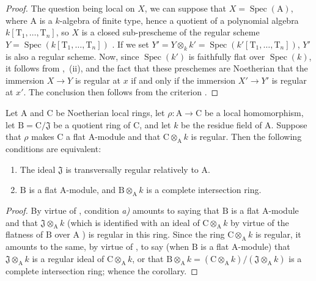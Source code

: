 \begin{proof}
The question being local on $X$, we can suppose that $X=\operatorname{Spec}(\mathrm{A})$, where $\mathrm{A}$ is a $k$-algebra of finite type, hence a quotient of a polynomial algebra $k[\mathrm{T}_1,\ldots,\mathrm{T}_n]$, so $X$ is a closed sub-prescheme of the regular scheme $Y=\operatorname{Spec}(k[\mathrm{T}_1,\ldots,\mathrm{T}_n])$ .
If we set $Y'=Y\otimes_k k'=\operatorname{Spec}(k'[\mathrm{T}_1,\ldots,\mathrm{T}_n])$, $Y'$ is also a regular scheme.
Now, since $\operatorname{Spec}(k')$ is faithfully flat over $\operatorname{Spec}(k)$, it follows from ,~(ii), and the fact that these preschemes are Noetherian that the immersion $X\to Y$ is regular at $x$ if and only if the immersion $X'\to Y'$ is regular at $x'$.
The conclusion then follows from the criterion .
\end{proof}

\begin{corollary}[19.3.5]
\label{IV.19.3.5}
Let $\mathrm{A}$ and $\mathrm{C}$ be Noetherian local rings, let $\rho:\mathrm{A}\to\mathrm{C}$ be a local homomorphism, let $\mathrm{B}=\mathrm{C}/\mathfrak{J}$ be a quotient ring of $\mathrm{C}$, and let $k$ be the residue field of $\mathrm{A}$.
Suppose that $\rho$ makes $\mathrm{C}$ a flat $\mathrm{A}$-module and that $\mathrm{C}\otimes_{\mathrm{A}}k$ is regular.
Then the following conditions are equivalent:
\begin{enumerate}[label=\emph{\alph*)}]
  \item The ideal $\mathfrak{J}$ is transversally regular relatively to $\mathrm{A}$.
  \item $\mathrm{B}$ is a flat $\mathrm{A}$-module, and $\mathrm{B}\otimes_{\mathrm{A}} k$ is a complete intersection ring.
\end{enumerate}
\end{corollary}

\begin{proof}
By virtue of , condition \emph{a)} amounts to saying that $\mathrm{B}$ is a flat $\mathrm{A}$-module and that $\mathfrak{J}\otimes_{\mathrm{A}} k$ (which is identified with an ideal of $\mathrm{C}\otimes_{\mathrm{A}} k$ by virtue of the flatness of $\mathrm{B}$ over $\mathrm{A}$ ) is regular in this ring.
Since the ring $\mathrm{C}\otimes_{\mathrm{A}} k$ is regular, it amounts to the same, by virtue of , to say (when $\mathrm{B}$ is a flat $\mathrm{A}$-module) that $\mathfrak{J}\otimes_{\mathrm{A}} k$ is a regular ideal of $\mathrm{C}\otimes_{\mathrm{A}} k$, or that $\mathrm{B}\otimes_{\mathrm{A}} k=(\mathrm{C}\otimes_{\mathrm{A}} k)/(\mathfrak{J}\otimes_{\mathrm{A}} k)$ is a complete intersection ring; whence the corollary.
\end{proof}

